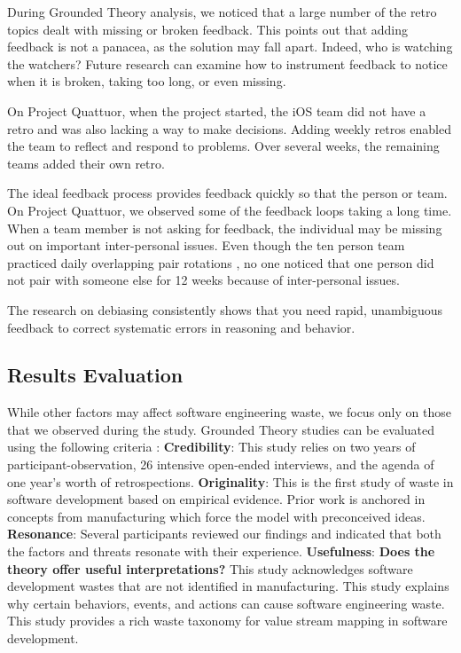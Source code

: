 During Grounded Theory analysis, we noticed that a large number of the retro topics dealt with missing or broken feedback. This points out that adding feedback is not a panacea, as the solution may fall apart. Indeed, who is watching the watchers? Future research can examine how to instrument feedback to notice when it is broken, taking too long, or even missing.

On Project Quattuor, when the project started, the iOS team did not have a retro and was also lacking a way to make decisions. Adding weekly retros enabled the team to reflect and respond to problems. Over several weeks, the remaining teams added their own retro. 

The ideal feedback process provides feedback quickly so that the person or team. On Project Quattuor, we observed  some of the feedback loops taking a long time. When a team member is not asking for feedback, the individual may be missing out on important inter-personal issues. Even though the ten person team practiced daily overlapping pair rotations \cite{SedanoSustainableSoftware}, no one noticed that one person did not pair with someone else for 12 weeks because of inter-personal issues. 

The research on debiasing consistently shows that you need rapid, unambiguous feedback to correct systematic errors in reasoning and behavior.


\subsection{Results Evaluation}
While other factors may affect software engineering waste, we focus only on those that we observed during the study. Grounded Theory studies can be evaluated using the following criteria \cite{Charmaz, StolGroundedTheory}:
\textbf{Credibility}:   This study relies on two years of participant-observation, 26 intensive open-ended interviews, and the agenda of one year's worth of retrospections. 
\textbf{Originality}:   This is the first study of waste in software development based on empirical evidence. Prior work is anchored in concepts from manufacturing which force the model with preconceived ideas. 
\textbf{Resonance}:  Several participants reviewed our findings and indicated that both the factors and threats resonate with their experience.
\textbf{Usefulness}: \textbf{Does the theory offer useful interpretations?} This study acknowledges software development wastes that are not identified in manufacturing. This study explains why certain behaviors, events, and actions can cause software engineering waste. This study provides a rich waste taxonomy for value stream mapping in software development. 


